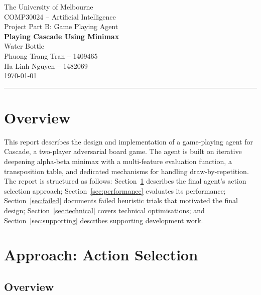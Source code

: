 \documentclass[10.5pt,a4paper]{article}
\begin{document}
\begin{center}
    {\large The University of Melbourne}\\[0.15em]
    {\large COMP30024 -- Artificial Intelligence}\\[0.1em]
    {\large Project Part B: Game Playing Agent}\\[0.9em]
    {\LARGE\bfseries Playing Cascade Using Minimax}\\[1em]
    {\normalsize Water Bottle}\\[0.3em]
    {\normalsize Phuong Trang Tran -- 1409465}\\[0.3em]
    {\normalsize Ha Linh Nguyen -- 1482069}\\[0.3em]
    {\normalsize \today}
\end{center}

\vspace{0.3em}
\hrule
\vspace{0.3em}

\section*{Overview}

This report describes the design and implementation of a game-playing agent for Cascade, a two-player adversarial board game. The agent is built on iterative deepening alpha-beta minimax with a multi-feature evaluation function, a transposition table, and dedicated mechanisms for handling draw-by-repetition. The report is structured as follows: Section~\ref{sec:approach} describes the final agent's action selection approach; Section~\ref{sec:performance} evaluates its performance; Section~\ref{sec:failed} documents failed heuristic trials that motivated the final design; Section~\ref{sec:technical} covers technical optimisations; and Section~\ref{sec:supporting} describes supporting development work.

\section{Approach: Action Selection}
\label{sec:approach}

\subsection{Overview}
\end{document}
